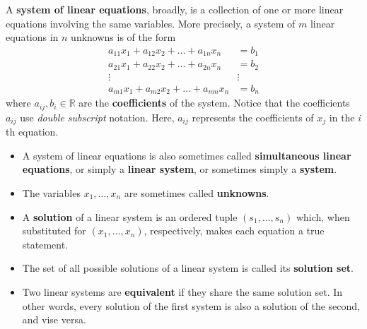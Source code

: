 \documentclass[letterpaper,12pt]{article}
\begin{document}
\begin{definition}
A \textbf{system of linear equations}, broadly, is a collection of one or more linear equations involving the same variables. More precisely, a system of $m$ linear equations in $n$ unknowns is of the form
\begin{align*}
    a_{11}x_1 + a_{12}x_2 + \dots + a_{1n}x_n & = b_1 \\
    a_{21}x_1 + a_{22}x_2 + \dots + a_{2n}x_n & = b_2 \\
    \vdots \qquad \qquad \qquad \qquad \qquad & \vdots \\
    a_{m1}x_1 + a_{m2}x_2 + \dots + a_{mn}x_n & = b_n
\end{align*}
where $a_{ij}, b_i \in \mathbb{R}$ are the \textbf{coefficients} of the system. Notice that the coefficients $a_{ij}$ use \textit{double subscript} notation. Here, $a_{ij}$ represents the coefficients of $x_j$ in the $i$th equation.
\begin{itemize}
    \item A system of linear equations is also sometimes called \textbf{simultaneous linear equations}, or simply a \textbf{linear system}, or sometimes simply a \textbf{system}.
    \item The variables $x_1, \dots, x_n$ are sometimes called \textbf{unknowns}.
    \item A \textbf{solution} of a linear system is an ordered tuple $(s_1, \dots, s_n)$ which, when substituted for $(x_1, \dots, x_n)$, respectively, makes each equation a true statement.
    \item The set of all possible solutions of a linear system is called its \textbf{solution set}.
    \item Two linear systems are \textbf{equivalent} if they share the same solution set. In other words, every solution of the first system is also a solution of the second, and vise versa.
\end{itemize}
\end{definition}
\end{document}

